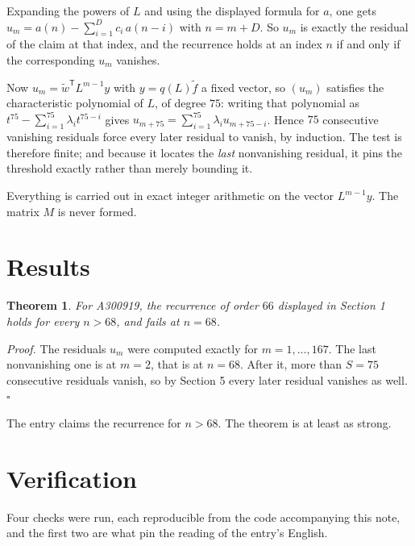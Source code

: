 \documentclass[11pt]{article}
\newtheorem{theorem}{Theorem}
\theoremstyle{definition}
\begin{document}
Expanding the powers of $L$ and using the displayed formula for $a$, one gets $u_m = a(n) - \sum_{i=1}^{D} c_i\,a(n-i)$ with $n = m + D$. So $u_m$ is exactly the residual of the claim at that index, and the recurrence holds at an index $n$ if and only if the corresponding $u_m$ vanishes.

Now $u_m = \tilde w^{\mathsf T} L^{m-1} y$ with $y = q(L)\tilde f$ a fixed vector, so $(u_m)$ satisfies the characteristic polynomial of $L$, of degree $75$: writing that polynomial as $t^{75} - \sum_{i=1}^{75} \lambda_i t^{75-i}$ gives $u_{m+75} = \sum_{i=1}^{75} \lambda_i u_{m+75-i}$. Hence $75$ consecutive vanishing residuals force every later residual to vanish, by induction. The test is therefore finite; and because it locates the {\itshape last} nonvanishing residual, it pins the threshold exactly rather than merely bounding it.

Everything is carried out in exact integer arithmetic on the vector $L^{m-1}y$. The matrix $M$ is never formed.

\section{Results}

\begin{theorem} For A300919, the recurrence of order $66$ displayed in Section 1 holds for every $n > 68$, and fails at $n = 68$.\end{theorem}

{\itshape Proof.} The residuals $u_m$ were computed exactly for $m = 1,\dots,167$. The last nonvanishing one is at $m = 2$, that is at $n = 68$. After it, more than $S = 75$ consecutive residuals vanish, so by Section 5 every later residual vanishes as well. $\square$

The entry claims the recurrence for $n > 68$. The theorem is at least as strong.

\section{Verification}

Four checks were run, each reproducible from the code accompanying this note, and the first two are what pin the reading of the entry's English.
\end{document}
